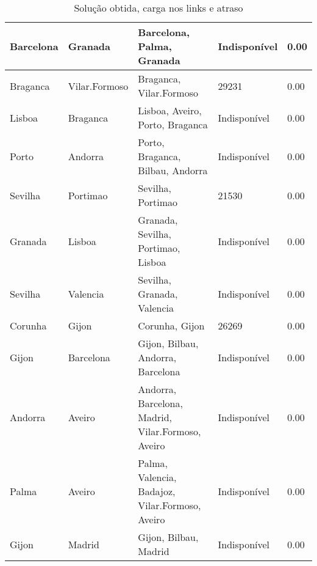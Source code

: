 \begin{table}[!htb]
{\begin{tabular}{|l|l|l|l|l|}
Barcelona & Granada & Barcelona, Palma, Granada & Indisponível & 0.00 \\ \hline
Braganca & Vilar.Formoso & Braganca, Vilar.Formoso & 29231 & 0.00 \\ \hline
Lisboa & Braganca & Lisboa, Aveiro, Porto, Braganca & Indisponível & 0.00 \\ \hline
Porto & Andorra & Porto, Braganca, Bilbau, Andorra & Indisponível & 0.00 \\ \hline
Sevilha & Portimao & Sevilha, Portimao & 21530 & 0.00 \\ \hline
Granada & Lisboa & Granada, Sevilha, Portimao, Lisboa & Indisponível & 0.00 \\ \hline
Sevilha & Valencia & Sevilha, Granada, Valencia & Indisponível & 0.00 \\ \hline
Corunha & Gijon & Corunha, Gijon & 26269 & 0.00 \\ \hline
Gijon & Barcelona & Gijon, Bilbau, Andorra, Barcelona & Indisponível & 0.00 \\ \hline
Andorra & Aveiro & Andorra, Barcelona, Madrid, Vilar.Formoso, Aveiro & Indisponível & 0.00 \\ \hline
Palma & Aveiro & Palma, Valencia, Badajoz, Vilar.Formoso, Aveiro & Indisponível & 0.00 \\ \hline
Gijon & Madrid & Gijon, Bilbau, Madrid & Indisponível & 0.00 \\ \hline
\end{tabular}}
\caption[]{Solução obtida, carga nos links e atraso}
\end{table}

\begin{table}[!htb]
        \centering
\caption[]{Solução obtida, carga nos links e atraso}
\end{table}

